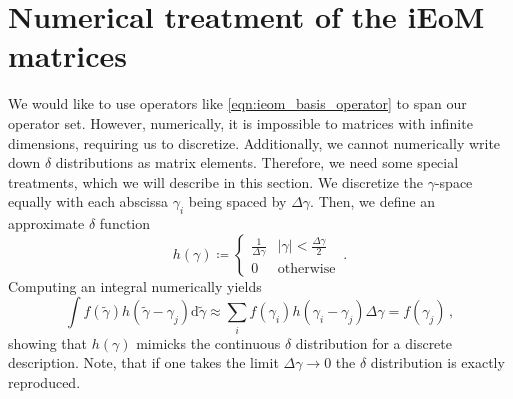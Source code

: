 \documentclass[
    reprint, 
    aps,
    preprintnumbers,
    twocolumn,
    prb,
    superscriptaddress
]{revtex4-2}
\begin{document}
\section{Numerical treatment of the iEoM matrices}
\label{sec:numerical_ieom}

We would like to use operators like \eqref{eqn:ieom_basis_operator} to span our operator set.
However, numerically, it is impossible to matrices with infinite dimensions, requiring us to discretize.
Additionally, we cannot numerically write down $\delta$ distributions as matrix elements. Therefore, we need some special treatments, which we will describe in this section.
We discretize the $\gamma$-space equally with each abscissa $\gamma_i$ being spaced by $\Delta \gamma$.
Then, we define an approximate $\delta$ function
\begin{equation}
    h(\gamma) \coloneqq \begin{cases}
        \frac{1}{\Delta \gamma} & |\gamma| < \frac{\Delta \gamma}{2} \\ 0 & \text{otherwise}
    \end{cases}\,.
\end{equation}
Computing an integral numerically yields
\begin{equation}
    \int f(\tilde{\gamma}) h(\tilde{\gamma} - \gamma_j) \mathrm{d} \tilde{\gamma} \approx \sum_i f(\gamma_i) h(\gamma_i - \gamma_j) \Delta \gamma = f(\gamma_j)\,,
\end{equation}
showing that $h(\gamma)$ mimicks the continuous $\delta$ distribution for a discrete description.
Note, that if one takes the limit $\Delta \gamma \to 0$ the $\delta$ distribution is exactly reproduced.
\end{document}
